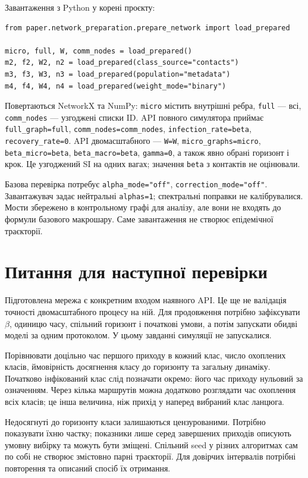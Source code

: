 \documentclass[11pt,a4paper]{article}
\begin{document}
Завантаження з Python у корені проєкту:
\begin{verbatim}
from paper.network_preparation.prepare_network import load_prepared

micro, full, W, comm_nodes = load_prepared()
m2, f2, W2, n2 = load_prepared(class_source="contacts")
m3, f3, W3, n3 = load_prepared(population="metadata")
m4, f4, W4, n4 = load_prepared(weight_mode="binary")
\end{verbatim}
Повертаються NetworkX та NumPy: \texttt{micro} містить внутрішні ребра, \texttt{full} --- всі, \texttt{comm\_nodes} --- узгоджені списки ID. API повного симулятора приймає \texttt{full\_graph=full}, \texttt{comm\_nodes=comm\_nodes}, \texttt{infection\_rate=beta}, \texttt{recovery\_rate=0}. API двомасштабного --- \texttt{W=W}, \texttt{micro\_graphs=micro}, \texttt{beta\_micro=beta}, \texttt{beta\_macro=beta}, \texttt{gamma=0}, а також явно обрані горизонт і крок. Це узгоджений SI на одних вагах; значення \texttt{beta} з контактів не оцінювали.

Базова перевірка потребує \texttt{alpha\_mode="off"}, \texttt{correction\_mode="off"}. Завантажувач задає нейтральні \texttt{alphas=1}; спектральні поправки не калібрувалися. Мости збережено в контрольному графі для аналізу, але вони не входять до формули базового макрошару. Саме завантаження не створює епідемічної траєкторії.

\section{Питання для наступної перевірки}
Підготовлена мережа є конкретним входом наявного API. Це ще не валідація точності двомасштабного процесу на ній. Для продовження потрібно зафіксувати $\beta$, одиницю часу, спільний горизонт і початкові умови, а потім запускати обидві моделі за одним протоколом. У цьому завданні симуляції не запускалися.

Порівнювати доцільно час першого приходу в кожний клас, число охоплених класів, ймовірність досягнення класу до горизонту та загальну динаміку. Початково інфікований клас слід позначати окремо: його час приходу нульовий за означенням. Через кілька маршрутів можна додатково розглядати час охоплення всіх класів; це інша величина, ніж прихід у наперед вибраний клас ланцюга.

Недосягнуті до горизонту класи залишаються цензурованими. Потрібно показувати їхню частку; показники лише серед завершених приходів описують умовну вибірку та можуть бути зміщені. Спільний seed у різних алгоритмах сам по собі не створює змістовно парні траєкторії. Для довірчих інтервалів потрібні повторення та описаний спосіб їх отримання.
\end{document}
